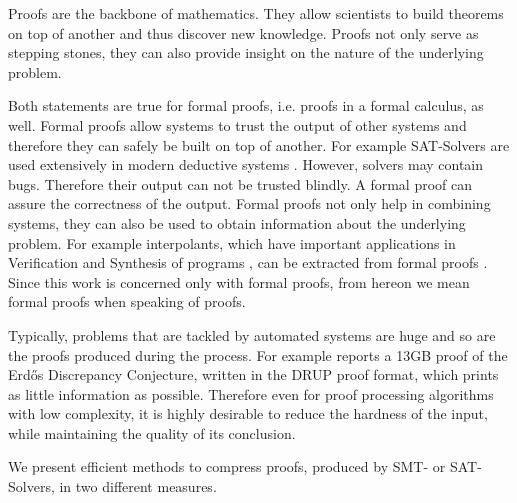 Proofs are the backbone of mathematics. 
They allow scientists to build theorems on top of another and thus discover new knowledge.
Proofs not only serve as stepping stones, they can also provide insight on the nature of the underlying problem.

Both statements are true for formal proofs, i.e. proofs in a formal calculus, as well.
Formal proofs allow systems to trust the output of other systems and therefore they can safely be built on top of another. 
For example SAT-Solvers are used extensively in modern deductive systems \cite{Biere2009}. 
However, solvers may contain bugs. 
Therefore their output can not be trusted blindly.
A formal proof can assure the correctness of the output.
Formal proofs not only help in combining systems, they can also be used to obtain information about the underlying problem.
For example interpolants, which have important applications in Verification and Synthesis of programs \cite{McMill2005}, can be extracted from formal proofs \cite{Hofferek2013}.
Since this work is concerned only with formal proofs, from hereon we mean formal proofs when speaking of proofs.

Typically, problems that are tackled by automated systems are huge and so are the proofs produced during the process.
For example \cite{Konev2014} reports a 13GB proof of the Erd\H{o}s Discrepancy Conjecture, written in the DRUP proof format, which prints as little information as possible.
Therefore even for proof processing algorithms with low complexity, it is highly desirable to reduce the hardness of the input, while maintaining the quality of its conclusion.

We present efficient methods to compress proofs, produced by SMT- or SAT- Solvers, in two different measures.

